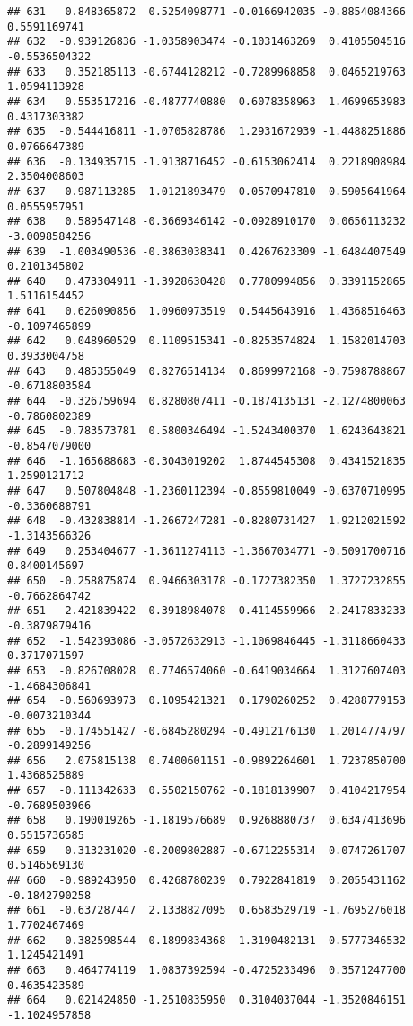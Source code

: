 \documentclass[
]{article}
\begin{document}
\begin{verbatim}
## 631   0.848365872  0.5254098771 -0.0166942035 -0.8854084366  0.5591169741
## 632  -0.939126836 -1.0358903474 -0.1031463269  0.4105504516 -0.5536504322
## 633   0.352185113 -0.6744128212 -0.7289968858  0.0465219763  1.0594113928
## 634   0.553517216 -0.4877740880  0.6078358963  1.4699653983  0.4317303382
## 635  -0.544416811 -1.0705828786  1.2931672939 -1.4488251886  0.0766647389
## 636  -0.134935715 -1.9138716452 -0.6153062414  0.2218908984  2.3504008603
## 637   0.987113285  1.0121893479  0.0570947810 -0.5905641964  0.0555957951
## 638   0.589547148 -0.3669346142 -0.0928910170  0.0656113232 -3.0098584256
## 639  -1.003490536 -0.3863038341  0.4267623309 -1.6484407549  0.2101345802
## 640   0.473304911 -1.3928630428  0.7780994856  0.3391152865  1.5116154452
## 641   0.626090856  1.0960973519  0.5445643916  1.4368516463 -0.1097465899
## 642   0.048960529  0.1109515341 -0.8253574824  1.1582014703  0.3933004758
## 643   0.485355049  0.8276514134  0.8699972168 -0.7598788867 -0.6718803584
## 644  -0.326759694  0.8280807411 -0.1874135131 -2.1274800063 -0.7860802389
## 645  -0.783573781  0.5800346494 -1.5243400370  1.6243643821 -0.8547079000
## 646  -1.165688683 -0.3043019202  1.8744545308  0.4341521835  1.2590121712
## 647   0.507804848 -1.2360112394 -0.8559810049 -0.6370710995 -0.3360688791
## 648  -0.432838814 -1.2667247281 -0.8280731427  1.9212021592 -1.3143566326
## 649   0.253404677 -1.3611274113 -1.3667034771 -0.5091700716  0.8400145697
## 650  -0.258875874  0.9466303178 -0.1727382350  1.3727232855 -0.7662864742
## 651  -2.421839422  0.3918984078 -0.4114559966 -2.2417833233 -0.3879879416
## 652  -1.542393086 -3.0572632913 -1.1069846445 -1.3118660433  0.3717071597
## 653  -0.826708028  0.7746574060 -0.6419034664  1.3127607403 -1.4684306841
## 654  -0.560693973  0.1095421321  0.1790260252  0.4288779153 -0.0073210344
## 655  -0.174551427 -0.6845280294 -0.4912176130  1.2014774797 -0.2899149256
## 656   2.075815138  0.7400601151 -0.9892264601  1.7237850700  1.4368525889
## 657  -0.111342633  0.5502150762 -0.1818139907  0.4104217954 -0.7689503966
## 658   0.190019265 -1.1819576689  0.9268880737  0.6347413696  0.5515736585
## 659   0.313231020 -0.2009802887 -0.6712255314  0.0747261707  0.5146569130
## 660  -0.989243950  0.4268780239  0.7922841819  0.2055431162 -0.1842790258
## 661  -0.637287447  2.1338827095  0.6583529719 -1.7695276018  1.7702467469
## 662  -0.382598544  0.1899834368 -1.3190482131  0.5777346532  1.1245421491
## 663   0.464774119  1.0837392594 -0.4725233496  0.3571247700  0.4635423589
## 664   0.021424850 -1.2510835950  0.3104037044 -1.3520846151 -1.1024957858

\end{verbatim}
\end{document}
